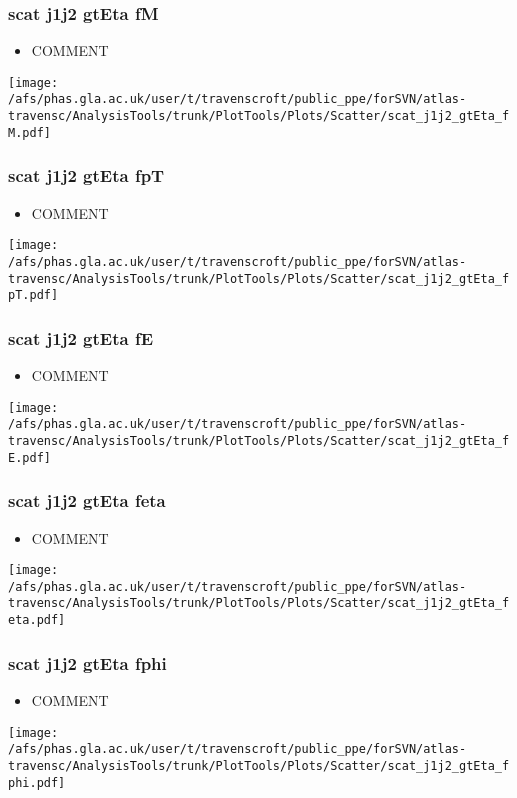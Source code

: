\documentclass{beamer}
\begin{document}
\begin{frame}
\frametitle{scat j1j2 gtEta fM}
\begin{itemize}
\item COMMENT
\end{itemize}
\begin{center}
\texttt{[image: /afs/phas.gla.ac.uk/user/t/travenscroft/public\_ppe/forSVN/atlas-travensc/AnalysisTools/trunk/PlotTools/Plots/Scatter/scat\_j1j2\_gtEta\_fM.pdf]}
\end{center}
\end{frame}

\begin{frame}
\frametitle{scat j1j2 gtEta fpT}
\begin{itemize}
\item COMMENT
\end{itemize}
\begin{center}
\texttt{[image: /afs/phas.gla.ac.uk/user/t/travenscroft/public\_ppe/forSVN/atlas-travensc/AnalysisTools/trunk/PlotTools/Plots/Scatter/scat\_j1j2\_gtEta\_fpT.pdf]}
\end{center}
\end{frame}

\begin{frame}
\frametitle{scat j1j2 gtEta fE}
\begin{itemize}
\item COMMENT
\end{itemize}
\begin{center}
\texttt{[image: /afs/phas.gla.ac.uk/user/t/travenscroft/public\_ppe/forSVN/atlas-travensc/AnalysisTools/trunk/PlotTools/Plots/Scatter/scat\_j1j2\_gtEta\_fE.pdf]}
\end{center}
\end{frame}

\begin{frame}
\frametitle{scat j1j2 gtEta feta}
\begin{itemize}
\item COMMENT
\end{itemize}
\begin{center}
\texttt{[image: /afs/phas.gla.ac.uk/user/t/travenscroft/public\_ppe/forSVN/atlas-travensc/AnalysisTools/trunk/PlotTools/Plots/Scatter/scat\_j1j2\_gtEta\_feta.pdf]}
\end{center}
\end{frame}

\begin{frame}
\frametitle{scat j1j2 gtEta fphi}
\begin{itemize}
\item COMMENT
\end{itemize}
\begin{center}
\texttt{[image: /afs/phas.gla.ac.uk/user/t/travenscroft/public\_ppe/forSVN/atlas-travensc/AnalysisTools/trunk/PlotTools/Plots/Scatter/scat\_j1j2\_gtEta\_fphi.pdf]}
\end{center}
\end{frame}
\end{document}
